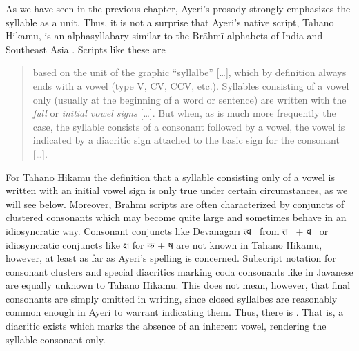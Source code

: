 As we have seen in the previous chapter, Ayeri's prosody strongly emphasizes 
the syllable as a unit. Thus, it is not a surprise that Ayeri's native script,
Tahano Hikamu, is an alphasyllabary similar to the Brāhmī alphabets of 
India and Southeast Asia \parencites{salomon1996}{court1996}. Scripts like these are 

\blockcquote[376]{salomon1996}{based on the unit of the graphic 
\enquote{syllalbe} […], which by definition always ends with a vowel (type V, 
CV, CCV, etc.). Syllables consisting of a vowel only (usually at the beginning 
of a word or sentence) are written with the \emph{full} or \emph{initial vowel 
signs} […]. But when, as is much more frequently the case, the syllable 
consists of a consonant followed by a vowel, the vowel is indicated by a 
diacritic sign attached to the basic sign for the consonant […].}

For Tahano Hikamu the definition that a syllable consisting only of a vowel is
written with an initial vowel sign is only true under certain circumstances, as
we will see below. Moreover, Brāhmī scripts are often characterized by
conjuncts of clustered consonants which may become quite large and sometimes
behave in an idiosyncratic way. Consonant conjuncts like Devanāgarī {\FS
त्व}~ from {\FS त}~ + {\FS व}~ or idiosyncratic
conjuncts like {\FS क्ष}  for {\FS क}  + {\FS ष} 
are not known in Tahano Hikamu, however, at least as far as Ayeri's spelling is
concerned. Subscript notation for consonant clusters and special diacritics
marking coda consonants like in Javanese \citep[478--479]{kuipersmcdermott1996}
are equally unknown to Tahano Hikamu. This does not mean, however, that final
consonants are simply omitted in writing, since closed syllalbes are reasonably
common enough in Ayeri to warrant indicating them. Thus, there is
. That is, a diacritic exists which marks the absence of an inherent
vowel, rendering the syllable consonant-only.

